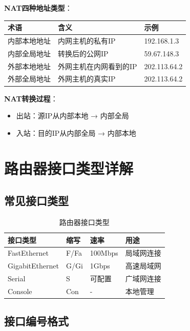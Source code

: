 \documentclass[12pt,a4paper]{ctexart}
\begin{document}
\begin{keybox}
\textbf{NAT四种地址类型}：

\begin{center}
\begin{tabular}{lll}
\toprule
\textbf{术语} & \textbf{含义} & \textbf{示例} \\
\midrule
内部本地地址 & 内网主机的私有IP & 192.168.1.3 \\
内部全局地址 & 转换后的公网IP & 59.67.148.3 \\
外部本地地址 & 外网主机在内网看到的IP & 202.113.64.2 \\
外部全局地址 & 外网主机的真实IP & 202.113.64.2 \\
\bottomrule
\end{tabular}
\end{center}

\textbf{NAT转换过程}：
\begin{itemize}[itemsep=0pt]
    \item 出站：源IP从内部本地 → 内部全局
    \item 入站：目的IP从内部全局 → 内部本地
\end{itemize}
\end{keybox}

\section{路由器接口类型详解}

\subsection{常见接口类型}

\begin{table}[htbp]
\centering
\begin{tabular}{llll}
\toprule
\textbf{接口类型} & \textbf{缩写} & \textbf{速率} & \textbf{用途} \\
\midrule
FastEthernet & F/Fa & 100Mbps & 局域网连接 \\
GigabitEthernet & G/Gi & 1Gbps & 高速局域网 \\
Serial & S & 可配置 & 广域网连接 \\
Console & Con & - & 本地管理 \\
\bottomrule
\end{tabular}
\caption{路由器接口类型}
\end{table}

\subsection{接口编号格式}
\end{document}
